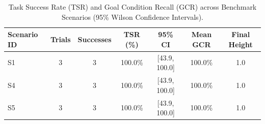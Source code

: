 \begin{table}[t]
\centering
\caption{Task Success Rate (TSR) and Goal Condition Recall (GCR) across Benchmark Scenarios (95\% Wilson Confidence Intervals).}
\label{tab:task_success}
\begin{tabular}{lcccccc}
\toprule
\textbf{Scenario ID} & \textbf{Trials} & \textbf{Successes} & \textbf{TSR (\%)} & \textbf{95\% CI} & \textbf{Mean GCR} & \textbf{Final Height} \\
\midrule
S1 & 3 & 3 & 100.0\% & [43.9, 100.0] & 100.0\% & 1.0 \\
S4 & 3 & 3 & 100.0\% & [43.9, 100.0] & 100.0\% & 1.0 \\
S5 & 3 & 3 & 100.0\% & [43.9, 100.0] & 100.0\% & 1.0 \\
\bottomrule
\end{tabular}
\end{table}